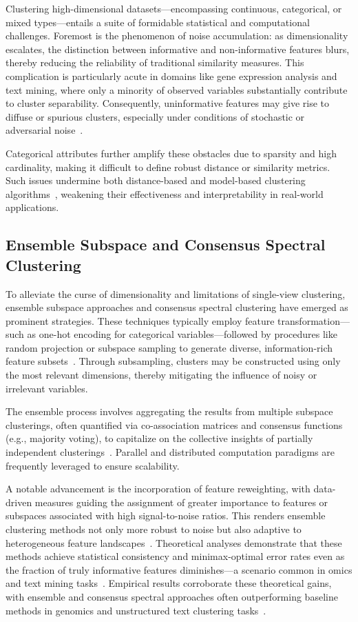 Clustering high-dimensional datasets—encompassing continuous, categorical, or mixed types—entails a suite of formidable statistical and computational challenges. Foremost is the phenomenon of noise accumulation: as dimensionality escalates, the distinction between informative and non-informative features blurs, thereby reducing the reliability of traditional similarity measures. This complication is particularly acute in domains like gene expression analysis and text mining, where only a minority of observed variables substantially contribute to cluster separability. Consequently, uninformative features may give rise to diffuse or spurious clusters, especially under conditions of stochastic or adversarial noise~\cite{ref116}. 

Categorical attributes further amplify these obstacles due to sparsity and high cardinality, making it difficult to define robust distance or similarity metrics. Such issues undermine both distance-based and model-based clustering algorithms~\cite{ref116}, weakening their effectiveness and interpretability in real-world applications.

\subsection{Ensemble Subspace and Consensus Spectral Clustering}

To alleviate the curse of dimensionality and limitations of single-view clustering, ensemble subspace approaches and consensus spectral clustering have emerged as prominent strategies. These techniques typically employ feature transformation—such as one-hot encoding for categorical variables—followed by procedures like random projection or subspace sampling to generate diverse, information-rich feature subsets~\cite{ref96,ref116}. Through subsampling, clusters may be constructed using only the most relevant dimensions, thereby mitigating the influence of noisy or irrelevant variables.

The ensemble process involves aggregating the results from multiple subspace clusterings, often quantified via co-association matrices and consensus functions (e.g., majority voting), to capitalize on the collective insights of partially independent clusterings~\cite{ref97,ref101}. Parallel and distributed computation paradigms are frequently leveraged to ensure scalability.

A notable advancement is the incorporation of feature reweighting, with data-driven measures guiding the assignment of greater importance to features or subspaces associated with high signal-to-noise ratios. This renders ensemble clustering methods not only more robust to noise but also adaptive to heterogeneous feature landscapes~\cite{ref99,ref116}. Theoretical analyses demonstrate that these methods achieve statistical consistency and minimax-optimal error rates even as the fraction of truly informative features diminishes—a scenario common in omics and text mining tasks~\cite{ref96,ref116}. Empirical results corroborate these theoretical gains, with ensemble and consensus spectral approaches often outperforming baseline methods in genomics and unstructured text clustering tasks~\cite{ref116}.

